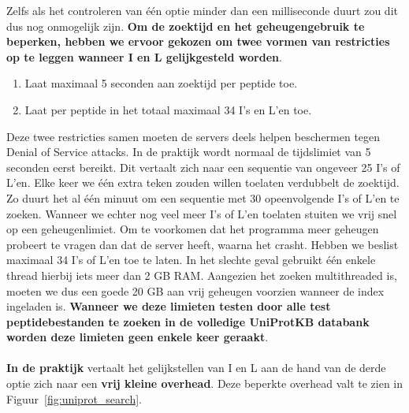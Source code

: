 Zelfs als het controleren van één optie minder dan een milliseconde duurt zou dit dus nog onmogelijk zijn.
\textbf{Om de zoektijd en het geheugengebruik te beperken, hebben we ervoor gekozen om twee vormen van restricties op te leggen wanneer I en L gelijkgesteld worden}.
\begin{enumerate}
    \item Laat maximaal 5 seconden aan zoektijd per peptide toe.
    \item Laat per peptide in het totaal maximaal 34 I's en L'en toe.
\end{enumerate}
Deze twee restricties samen moeten de servers deels helpen beschermen tegen Denial of Service attacks.
In de praktijk wordt normaal de tijdslimiet van 5 seconden eerst bereikt.
Dit vertaalt zich naar een sequentie van ongeveer 25 I's of L'en.
Elke keer we één extra teken zouden willen toelaten verdubbelt de zoektijd.
Zo duurt het al één minuut om een sequentie met 30 opeenvolgende I's of L'en te zoeken.
Wanneer we echter nog veel meer I's of L'en toelaten stuiten we vrij snel op een geheugenlimiet.
Om te voorkomen dat het programma meer geheugen probeert te vragen dan dat de server heeft, waarna het crasht.
Hebben we beslist maximaal 34 I's of L'en toe te laten.
In het slechte geval gebruikt één enkele thread hierbij iets meer dan 2 GB RAM\@.
Aangezien het zoeken multithreaded is, moeten we dus een goede 20 GB aan vrij geheugen voorzien wanneer de index ingeladen is.
\textbf{Wanneer we deze limieten testen door alle test peptidebestanden te zoeken in de volledige UniProtKB databank worden deze limieten geen enkele keer geraakt}.
\\ \\
\textbf{In de praktijk} vertaalt het gelijkstellen van I en L aan de hand van de derde optie zich naar een \textbf{vrij kleine overhead}.
Deze beperkte overhead valt te zien in Figuur~\ref{fig:uniprot_search}.


